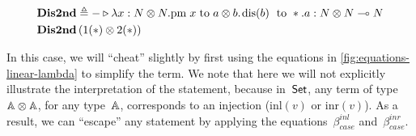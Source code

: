 \begin{example}
   \begin{equation*}
    \begin{split}
    & \textbf{Dis2nd} \triangleq - \triangleright \lambda x: N \otimes N. \text{pm} \hspace{3 pt} x \hspace{3 pt} \text{to} \hspace{3 pt} a \otimes b. \hspace{1 pt} \text{dis}(b) \hspace{3 pt} \text{ to } *.a: N \otimes N \multimap N \\
    & \textbf{Dis2nd} \,(1 (*) \otimes 2(*)) \\
    \end{split}
   \end{equation*}

   \begin{comment}
     &  \textbf{Dis1stOR2nd} \triangleq - \triangleright  \lambda y: N \otimes N . \, 
\text{case } \text{inl} (*) \,  
  \left\{
    \begin{aligned} 
    &\inl_{\typeB}(w) \Rightarrow  \textbf{Dis1st} \, x; \\
    &\inr_{\typeB}(z) \Rightarrow  \textbf{Dis2nd} \, x   \\ 
  \end{aligned}  
  \right\} : N \otimes N \multimap N  & \\
  & \textbf{Dis1stOR2nd} \, (1 (*) \otimes 2(*)) : N 
    \end{comment}

  In this case, we will ``cheat'' slightly by first using the equations in \autoref{fig:equations-linear-lambda} to simplify the term. We note that here we will not explicitly  illustrate the interpretation of the  statement, because in~$\mathsf{Set}$, any term of type~$\mathbb{A} \otimes \mathbb{A}$, for any type~$\mathbb{A}$, corresponds to an injection ($\text{inl}(v)$ or $\text{inr}(v)$). As a result, we can ``escape'' any  statement by  applying the equations~$\beta_{case}^{inl}$ and~$\beta_{case}^{inr}$.


   

\end{example}
